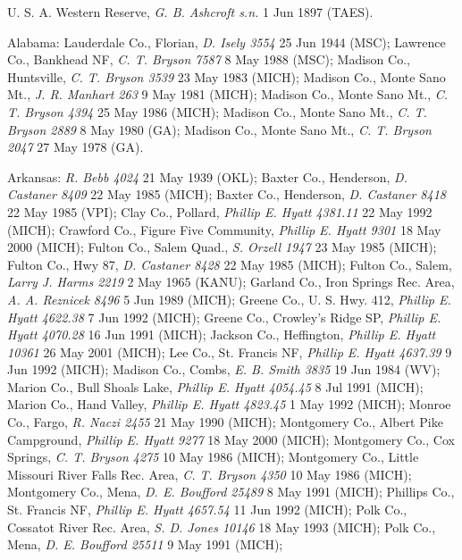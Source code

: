 \documentclass{article}
\begin{document}
U. S. A. 
Western Reserve, \textit{G. B. Ashcroft s.n.} 1 Jun 1897 (TAES).

\begin{sloppypar}
Alabama:
Lauderdale Co., Florian, \textit{D. Isely 3554} 25 Jun 1944 (MSC);
Lawrence Co., Bankhead NF, \textit{C. T. Bryson 7587} 8 May 1988 (MSC);
Madison Co., Huntsville, \textit{C. T. Bryson 3539} 23 May 1983 (MICH);
Madison Co., Monte Sano Mt., \textit{J. R. Manhart 263} 9 May 1981 (MICH);
Madison Co., Monte Sano Mt., \textit{C. T. Bryson 4394} 25 May 1986 (MICH);
Madison Co., Monte Sano Mt., \textit{C. T. Bryson 2889} 8 May 1980 (GA);
Madison Co., Monte Sano Mt., \textit{C. T. Bryson 2047} 27 May 1978 (GA).
\end{sloppypar}

Arkansas:
\textit{R. Bebb 4024} 21 May 1939 (OKL);
Baxter Co., Henderson, \textit{D. Castaner 8409} 22 May 1985 (MICH);
Baxter Co., Henderson, \textit{D. Castaner 8418} 22 May 1985 (VPI);
Clay Co., Pollard, \textit{Phillip E. Hyatt 4381.11} 22 May 1992 (MICH);
Crawford Co., Figure Five Community, \textit{Phillip E. Hyatt 9301} 18 May 2000 (MICH);
Fulton Co., Salem Quad., \textit{S. Orzell 1947} 23 May 1985 (MICH);
Fulton Co., Hwy 87, \textit{D. Castaner 8428} 22 May 1985 (MICH);
Fulton Co., Salem, \textit{Larry J. Harms 2219} 2 May 1965 (KANU);
Garland Co., Iron Springs Rec. Area, \textit{A. A. Reznicek 8496} 5 Jun 1989 (MICH);
Greene Co.,  U. S. Hwy. 412, \textit{Phillip E. Hyatt 4622.38} 7 Jun 1992 (MICH);
Greene Co., Crowley's Ridge SP, \textit{Phillip E. Hyatt 4070.28} 16 Jun 1991 (MICH);
Jackson Co., Heffington, \textit{Phillip E. Hyatt 10361} 26 May 2001 (MICH);
Lee Co., St. Francis NF, \textit{Phillip E. Hyatt 4637.39} 9 Jun 1992 (MICH);
Madison Co., Combs, \textit{E. B. Smith 3835} 19 Jun 1984 (WV);
Marion Co., Bull Shoals Lake, \textit{Phillip E. Hyatt 4054.45} 8 Jul 1991 (MICH);
Marion Co., Hand Valley, \textit{Phillip E. Hyatt 4823.45} 1 May 1992 (MICH);
Monroe Co., Fargo, \textit{R. Naczi 2455} 21 May 1990 (MICH);
Montgomery Co., Albert Pike Campground, \textit{Phillip E. Hyatt 9277} 18 May 2000 (MICH);
Montgomery Co., Cox Springs, \textit{C. T. Bryson 4275} 10 May 1986 (MICH);
Montgomery Co., Little Missouri River Falls Rec. Area, \textit{C. T. Bryson 4350} 10 May 1986 (MICH);
Montgomery Co., Mena, \textit{D. E. Boufford 25489} 8 May 1991 (MICH);
Phillips Co., St. Francis NF, \textit{Phillip E. Hyatt 4657.54} 11 Jun 1992 (MICH);
Polk Co., Cossatot River Rec. Area, \textit{S. D. Jones 10146} 18 May 1993 (MICH);
Polk Co., Mena, \textit{D. E. Boufford 25511} 9 May 1991 (MICH);
\end{document}
